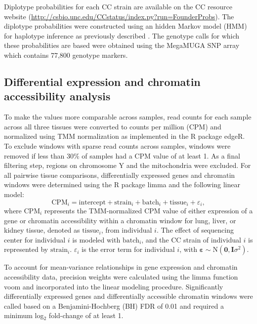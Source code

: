 Diplotype probabilities for each CC strain are available on the CC resource website (\url{http://csbio.unc.edu/CCstatus/index.py?run=FounderProbs}). The diplotype probabilities were constructed using an hidden Markov model (HMM) for haplotype inference as previously described \citep{Fu2012}. The genotype calls for which these probabilities are based were obtained using the MegaMUGA SNP array which contains 77,800 genotype markers.

\subsection{Differential expression and chromatin accessibility analysis}

To make the values more comparable across samples, read counts for each sample across all three tissues were converted to counts per million (CPM) and normalized using TMM normalization as implemented in the R package edgeR. To exclude windows with sparse read counts across samples, windows were removed if less than 30\% of samples had a CPM value of at least 1. As a final filtering step, regions on chromosome Y and the mitochondria were excluded. For all pairwise tissue comparisons, differentially expressed genes and chromatin windows were determined using the R package limma and the following linear model:
\begin{equation}
\text{CPM}_{i} = \text{intercept} + \text{strain}_{i} + \text{batch}_{i} + \text{tissue}_{i} + \varepsilon_{i},
\label{eq:limma_model}
\end{equation}
where $\text{CPM}_{i}$ represents the TMM-normalized CPM value of either expression of a gene or chromatin accessibility within a chromatin window for lung, liver, or kidney tissue, denoted as $\text{tissue}_{i}$, from individual $i$. The effect of sequencing center for individual $i$ is modeled with $\text{batch}_{i}$, and the CC strain of individual $i$ is represented by $\text{strain}_i$. $\varepsilon_{i}$ is the error term for individual $i$, with $\boldsymbol{\varepsilon} \sim \text{N}(\mathbf{0}, \mathbf{I}\sigma^{2})$.

To account for mean-variance relationships in gene expression and chromatin accessibility data, precision weights were calculated using the limma function voom and incorporated into the linear modeling procedure. Significantly differentially expressed genes and differentially accessible chromatin windows were called based on a Benjamini-Hochberg (BH) FDR of 0.01 and required a minimum log$_{2}$ fold-change of at least 1.


